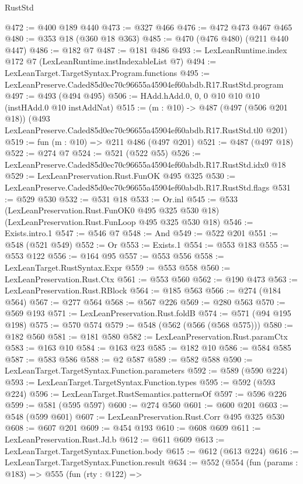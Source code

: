 \begin{lexlean}{RustStd}
\begin{coremodule}
@472 := @400 @189 @440
@473 := @327 @466
@476 := @472 @473 @467 @465
@480 := @353 @18 (@360 @18 @363)
@485 := @470 (@476 @480) (@211 @440 @447)
@486 := @182 @7
@487 := @181 @486
@493 := LexLeanRuntime.index @172 @7 (LexLeanRuntime.instIndexableList @7)
@494 := LexLeanTarget.TargetSyntax.Program.functions
@495 := LexLeanPreserve.Caded85d0ec70c96655a45904ef60abdb.R17.RustStd.program
@497 := @493 (@494 @495)
@506 := HAdd.hAdd.{0, 0, 0} @10 @10 @10 (instHAdd.{0} @10 instAddNat)
@515 := (m : @10) ->
  @487
    (@497 (@506 @201 @18))
    (@493 LexLeanPreserve.Caded85d0ec70c96655a45904ef60abdb.R17.RustStd.tl0 @201)
@519 := fun (m : @10) => @211 @486 (@497 @201)
@521 := @487 (@497 @18)
@522 := @274 @7
@524 := @521 (@522 @55)
@526 := LexLeanPreserve.Caded85d0ec70c96655a45904ef60abdb.R17.RustStd.idx0 @18
@529 := LexLeanPreservation.Rust.FunOK @495 @325
@530 := LexLeanPreserve.Caded85d0ec70c96655a45904ef60abdb.R17.RustStd.flags
@531 := @529 @530
@532 := @531 @18
@533 := Or.inl
@545 := @533
    (LexLeanPreservation.Rust.FunOK0 @495 @325 @530 @18)
    (LexLeanPreservation.Rust.FunLoop @495 @325 @530 @18)
@546 := Exists.intro.{1}
@547 := @546 @7
@548 := And
@549 := @522 @201
@551 := @548 (@521 @549)
@552 := Or
@553 := Exists.{1}
@554 := @553 @183
@555 := @553 @122
@556 := @164 @95
@557 := @553 @556
@558 := LexLeanTarget.RustSyntax.Expr
@559 := @553 @558
@560 := LexLeanPreservation.Rust.Ctx
@561 := @553 @560
@562 := @190 @473
@563 := LexLeanPreservation.Rust.RBlock
@564 := @185 @563
@566 := @274 (@184 @564)
@567 := @277 @564
@568 := @567 @226
@569 := @280 @563
@570 := @569 @193
@571 := LexLeanPreservation.Rust.foldB
@574 := @571 (@94 @195 @198)
@575 := @570 @574
@579 := @548 (@562 (@566 (@568 @575)))
@580 := @182 @560
@581 := @181 @580
@582 := LexLeanPreservation.Rust.paramCtx
@583 := @163 @10
@584 := @163 @23
@585 := @182 @10
@586 := @584 @585
@587 := @583 @586
@588 := @2 @587
@589 := @582 @588
@590 := LexLeanTarget.TargetSyntax.Function.parameters
@592 := @589 (@590 @224)
@593 := LexLeanTarget.TargetSyntax.Function.types
@595 := @592 (@593 @224)
@596 := LexLeanTarget.RustSemantics.patternsOf
@597 := @596 @226
@599 := @581 (@595 @597)
@600 := @274 @560
@601 := @600 @201
@603 := @548 (@599 @601)
@607 := LexLeanPreservation.Rust.Corr @495 @325 @530
@608 := @607 @201
@609 := @454 @193
@610 := @608 @609
@611 := LexLeanPreservation.Rust.Jd.b
@612 := @611 @609
@613 := LexLeanTarget.TargetSyntax.Function.body
@615 := @612 (@613 @224)
@616 := LexLeanTarget.TargetSyntax.Function.result
@634 := @552
    (@554
      (fun (params : @183) =>
      @555
        (fun (rty : @122) =>

\end{coremodule}
\end{lexlean}
